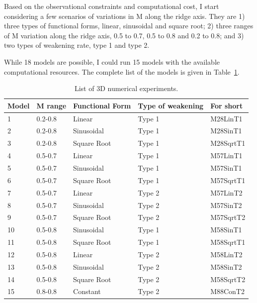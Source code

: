 Based on the observational constraints and computational cost, I start considering a few scenarios of variations in M along the ridge axis. They are 1) three types of functional forms, linear, sinusoidal and square root; 2) three ranges of M variation along the ridge axis, 0.5 to 0.7, 0.5 to 0.8 and 0.2 to 0.8; and 3) two types of weakening rate, type 1 and type 2.

While 18 models are possible, I could run 15 models with the available computational resources. 
The complete list of the models is given in Table~\hyperref[Tab1_1]{\ref{Tab1_1}}. 

\begin{table}[h]
\centering
\begin{tabular}{l l l l l}
\hline
\hline
Model& M range & Functional Form & Type of weakening & For short \\ 
\hline
1    &  0.2-0.8    &   Linear        & Type 1   &  M28LinT1\\
\hline
2    &  0.2-0.8    &   Sinusoidal    & Type 1   &  M28SinT1\\
\hline
3    &  0.2-0.8    &   Square Root   & Type 1   &  M28SqrtT1 \\
\hline
4    &  0.5-0.7    &   Linear        & Type 1   &  M57LinT1 \\
\hline
5    &  0.5-0.7    &   Sinusoidal    & Type 1   &  M57SinT1 \\
\hline
6    &  0.5-0.7    &   Square Root    & Type 1   &  M57SqrtT1 \\
\hline
7    &  0.5-0.7    &   Linear       & Type 2   &  M57LinT2 \\
\hline
8    &  0.5-0.7    &   Sinusoidal    & Type 2   &  M57SinT2 \\
\hline
9    &  0.5-0.7    &   Square Root   & Type 2   &  M57SqrtT2  \\
\hline
10    &  0.5-0.8    &   Sinusoidal    & Type 1   &  M58SinT1  \\
\hline
11   &  0.5-0.8    &   Square Root   & Type 1   &  M58SqrtT1   \\
\hline
12    &  0.5-0.8    &   Linear        & Type 2   &  M58LinT2   \\
\hline
13    &  0.5-0.8    &   Sinusoidal    & Type 2   &  M58SinT2   \\
\hline
14   &  0.5-0.8    &   Square Root   & Type 2   &  M58SqrtT2   \\
\hline
15   &  0.8-0.8    &   Constant      & Type 2   &  M88ConT2 \\
\hline
\hline
\end{tabular}
\caption{List of 3D numerical experiments.}
\label{Tab1_1}
\end{table}

